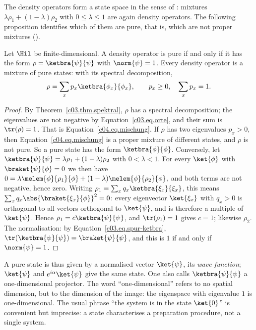 The density operators form a state space in the sense of : mixtures
$\lambda\rho_1 + (1-\lambda)\rho_2$ with $0 \leq \lambda \leq 1$ are again density operators.
The following proposition identifies which of them are pure, that is, which are not proper
mixtures ().

\begin{proposition}\label{c04.prop.rein}
  Let $\Hil$ be finite-dimensional. A density operator is pure if and only if it has the form
  $\rho = \ketbra{\psi}{\psi}$ with $\norm{\psi} = 1$. Every density operator is a mixture of pure
  states: with its spectral decomposition,
  \begin{equation}\label{c04.eq.mischung}
    \rho = \sum_x p_x \ketbra{\phi_x}{\phi_x} ,
    \qquad p_x \geq 0 , \quad \sum_x p_x = 1 .
  \end{equation}
\end{proposition}
\begin{proof}
  By Theorem~\ref{c03.thm.spektral}, $\rho$ has a spectral decomposition; the eigenvalues are not
  negative by Equation~\eqref{c03.eq.orte}, and their sum is $\tr(\rho) = 1$. That is
  Equation~\eqref{c04.eq.mischung}. If $\rho$ has two eigenvalues $p_x > 0$, then
  Equation~\eqref{c04.eq.mischung} is a proper mixture of different states, and $\rho$ is not pure.
  So a pure state has the form $\ketbra{\phi}{\phi}$. Conversely, let
  $\ketbra{\psi}{\psi} = \lambda\rho_1 + (1-\lambda)\rho_2$ with $0 < \lambda < 1$. For every
  $\ket{\phi}$ with $\braket{\psi}{\phi} = 0$ we then have
  $0 = \lambda\melem{\phi}{\rho_1}{\phi} + (1-\lambda)\melem{\phi}{\rho_2}{\phi}$, and both terms
  are not negative, hence zero. Writing $\rho_1 = \sum_x q_x \ketbra{\xi_x}{\xi_x}$, this means
  $\sum_x q_x \abs{\braket{\xi_x}{\phi}}^2 = 0$: every eigenvector $\ket{\xi_x}$ with $q_x > 0$
  is orthogonal to all vectors orthogonal to $\ket{\psi}$, and is therefore a multiple of
  $\ket{\psi}$. Hence $\rho_1 = c\ketbra{\psi}{\psi}$, and $\tr(\rho_1) = 1$ gives $c = 1$;
  likewise $\rho_2$. The normalisation: by Equation~\eqref{c03.eq.spur-ketbra},
  $\tr(\ketbra{\psi}{\psi}) = \braket{\psi}{\psi}$, and this is $1$ if and only if
  $\norm{\psi} = 1$.
\end{proof}

A pure state is thus given by a normalised vector $\ket{\psi}$, its \emph{wave function};
$\ket{\psi}$ and $e^{i\alpha}\ket{\psi}$ give the same state. One also calls $\ketbra{\psi}{\psi}$
a one-dimensional projector. The word ``one-dimensional'' refers to no spatial dimension, but to
the dimension of the image: the eigenspace with eigenvalue $1$ is one-dimensional. The usual
phrase ``the system is in the state $\ket{0}$'' is convenient but imprecise: a state characterises
a preparation procedure, not a single system.

